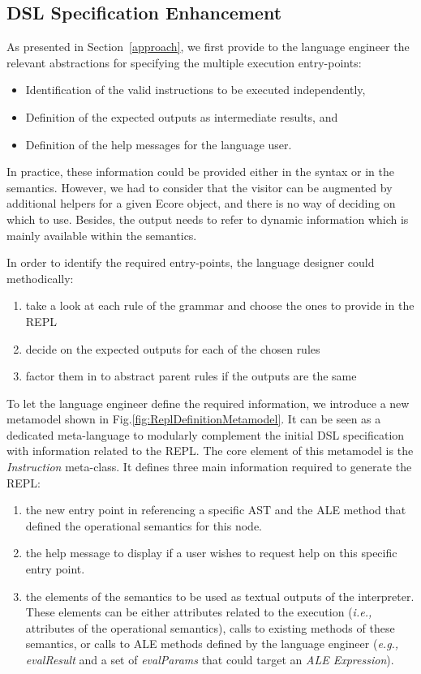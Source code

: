 \subsection{DSL Specification Enhancement}\label{sec:v2rmetamodel}

As presented in Section~\ref{approach}, we first provide to the language engineer the relevant abstractions for specifying the multiple execution entry-points:
\begin{itemize}
    \item Identification of the valid instructions to be executed independently,
    \item Definition of the expected outputs as intermediate results, and
    \item Definition of the help messages for the language user. 
\end{itemize}

In practice, these information could be provided either in the syntax or in the semantics. However, we had to consider that the visitor can be augmented by additional helpers for a given Ecore object, and there is no way of deciding on which to use. Besides, the output needs to refer to dynamic information which is mainly available within the semantics. %

In order to identify the required entry-points, the language designer could methodically:
\begin{enumerate}
  \item take a look at each rule of the grammar and choose the ones to provide in the REPL
  \item decide on the expected outputs for each of the chosen rules
  \item factor them in to abstract parent rules if the outputs are the same
\end{enumerate}

To let the language engineer define the required information, we introduce a new metamodel shown in Fig.\ref{fig:ReplDefinitionMetamodel}. It can be seen as a dedicated meta-language to modularly complement the initial DSL specification with information related to the REPL. The core element of this metamodel is the \textit{Instruction} meta-class. It defines three main information required to generate the REPL:
\begin{enumerate}
   \item the new entry point in referencing a specific AST and the ALE method that defined the operational semantics for this node.  
  \item the help message to display if a user wishes to request help on this specific entry point.
  \item the elements of the semantics to be used as textual outputs of the interpreter. These elements can be either attributes related to the execution (\emph{i.e.,} attributes of the operational semantics), calls to existing methods of these semantics, or calls to ALE methods defined by the language engineer (\emph{e.g.,} \textit{evalResult} and a set of \textit{evalParams} that could target an \textit{ALE Expression}).
\end{enumerate}

